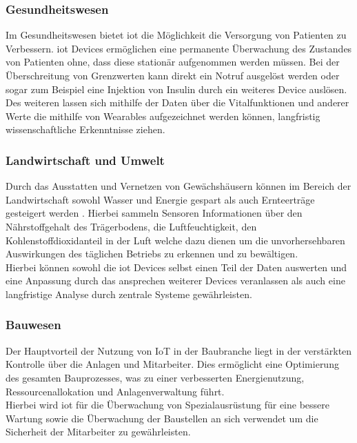 \documentclass[a4paper, 12pt, twoside, headsepline=true]{scrartcl} %
\begin{document}
\subsubsection{Gesundheitswesen}
Im Gesundheitswesen bietet \ac{iot} die Möglichkeit die Versorgung von Patienten zu Verbessern\cite[S.68-72]{iotDevelopments}. \ac{iot} Devices ermöglichen eine permanente Überwachung des Zustandes von Patienten ohne, dass diese stationär aufgenommen werden müssen. Bei der Überschreitung von Grenzwerten kann direkt ein Notruf ausgelöst werden oder sogar zum Beispiel eine Injektion von Insulin durch ein weiteres Device auslösen.\\
Des weiteren lassen sich mithilfe der Daten über die Vitalfunktionen und anderer Werte die mithilfe von Wearables aufgezeichnet werden können, langfristig wissenschaftliche Erkenntnisse ziehen.

\subsubsection{Landwirtschaft und Umwelt}
 Durch das Ausstatten und Vernetzen von Gewächshäusern können im Bereich der Landwirtschaft sowohl Wasser und Energie gespart als auch Ernteerträge gesteigert werden \cite[S.74-75]{iotDevelopments}. Hierbei sammeln Sensoren Informationen über den Nährstoffgehalt des Trägerbodens, die Luftfeuchtigkeit, den Kohlenstoffdioxidanteil in der Luft welche dazu dienen um die unvorhersehbaren Auswirkungen des täglichen Betriebs zu erkennen und zu bewältigen.\\ Hierbei können sowohl die \ac{iot} Devices selbst einen Teil der Daten auswerten und eine Anpassung durch das ansprechen weiterer Devices veranlassen als auch eine langfristige Analyse durch zentrale Systeme gewährleisten.

\subsubsection{Bauwesen}
Der Hauptvorteil der Nutzung von IoT in der Baubranche liegt in der verstärkten Kontrolle über die Anlagen und Mitarbeiter. Dies ermöglicht eine Optimierung des gesamten Bauprozesses, was zu einer verbesserten Energienutzung, Ressourcenallokation und Anlagenverwaltung führt. \\
Hierbei wird \ac{iot} für die Überwachung von Spezialausrüstung für eine bessere Wartung sowie die Überwachung der Baustellen an sich verwendet um die Sicherheit der Mitarbeiter zu gewährleisten.
\end{document}
